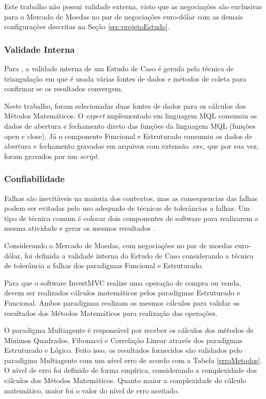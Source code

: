 Este trabalho não possui validade externa, visto que as negociações são exclusivas para o Mercado de Moedas no par de negociações euro-dólar com as demais configurações descritas na Seção \ref{sec:projetoEstudo}.

\subsubsection{Validade Interna}
Para , a validade interna de um Estudo de Caso é gerada pela técnica de triangulação em que é usada várias fontes de dados e métodos de coleta para confirmar se os resultados convergem. 

Neste trabalho, foram selecionadas duas fontes de dados para os cálculos dos Métodos Matemáticos. O \textit{expert} implementado em linguagem MQL consumiu os dados de abertura e fechamento direto das funções da linguagem MQL (funções open e close). Já o componente Funcional e Estruturado consumiu os dados de abertura e fechamento gravados em arquivos com extensão .csv, que por sua vez, foram gravados por um \textit{script}.

\subsubsection{Confiabilidade}
Falhas são inevitáveis na maioria dos contextos, mas as consequencias das falhas podem ser evitadas pelo uso adequado de técnicas de tolerâncias a falhas. Um tipo de técnica comum é colocar dois componentes de software para realizarem a mesma atividade e gerar os mesmos resultados \cite{weber}.

Considerando o Mercado de Moedas, com negociações no par de moedas euro-dólar, foi definida a validade interna do Estudo de Caso considerando a técnica de tolerância a falhas dos paradigmas Funcional e Estruturado.

Para que o software InvestMVC realize uma operação de compra ou venda, devem ser realizados cálculos matemáticos pelos paradigmas Estruturado e Funcional. Ambos paradigmas realizam os mesmos cálculos para validar os resultados dos Métodos Matemáticos para realização das operações. 

O paradigma Multiagente é responsável por receber os cálculos dos métodos de Mínimos Quadrados, Fibonacci e Correlação Linear através dos paradigmas Estruturado e Lógico. Feito isso, os resultados fornecidos são validados pelo paradigma Multiagente com um nível erro de acordo com a Tabela \ref{erroMetodos}. O nível de erro foi definido de forma empírica, considerando a complexidade dos cálculos dos Métodos Matemáticos. Quanto maior a complexidade do cálculo matemático, maior foi o valor do nível de erro aceitado.

